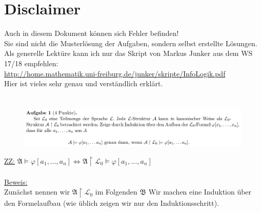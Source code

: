 \documentclass[a4paper]{scrartcl}
\begin{document}
\section*{Disclaimer}%
\label{sec:disclaimer}
Auch in diesem Dokument können sich Fehler befinden!\\
Sie sind nicht die Musterlösung der Aufgaben, sondern selbst erstellte Lösungen.\\

Als generelle Lektüre kann ich nur das Skript von Markus Junker aus dem WS 17/18 empfehlen:\\
\url{http://home.mathematik.uni-freiburg.de/junker/skripte/InfoLogik.pdf}\\
Hier ist vieles sehr genau und verständlich erklärt.

\section*{}%
\label{sec:aufgabe_1}

    \begin{figure}[H]
        \centering
        \includegraphics[scale=0.3]{./A-1.png}
        \label{fig:}
    \end{figure}

    \underline{ZZ:} $\mathfrak{A} \vDash \varphi[a_1,\dots,a_n] \Leftrightarrow \mathfrak{A} \upharpoonright \mathscr{L}_0 \vDash \varphi[a_1,\dots,a_n]$\\
    \\\underline{Beweis:}\\
        Zunächst nennen wir $\mathfrak{A} \upharpoonright \mathscr{L}_0$ im Folgenden $\mathfrak{B}$
        Wir machen eine Induktion über den Formelaufbau (wie üblich zeigen wir nur den Induktionsschritt).\\
\end{document}
